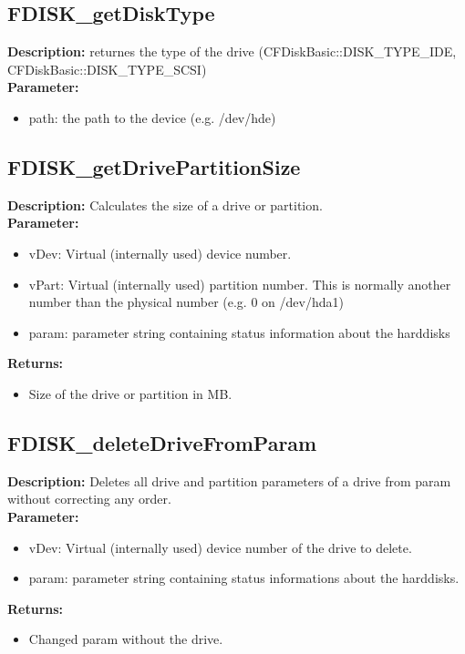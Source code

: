 \subsection{FDISK\_getDiskType}
\textbf{Description:} returnes the type of the drive (CFDiskBasic::DISK\_TYPE\_IDE, CFDiskBasic::DISK\_TYPE\_SCSI)\\
\textbf{Parameter:}
\begin{itemize}
\item path: the path to the device (e.g. /dev/hde)
\end{itemize}

\subsection{FDISK\_getDrivePartitionSize}
\textbf{Description:} Calculates the size of a drive or partition.\\
\textbf{Parameter:}
\begin{itemize}
\item vDev: Virtual (internally used) device number.
\item vPart: Virtual (internally used) partition number. This is normally another number than the physical number (e.g. 0 on /dev/hda1)
\item param: parameter string containing status information about the harddisks
\end{itemize}
\textbf{Returns:}
\begin{itemize}
\item Size of the drive or partition in MB.
\end{itemize}

\subsection{FDISK\_deleteDriveFromParam}
\textbf{Description:} Deletes all drive and partition parameters of a drive from param without correcting any order.\\
\textbf{Parameter:}
\begin{itemize}
\item vDev: Virtual (internally used) device number of the drive to delete.
\item param: parameter string containing status informations about the harddisks.
\end{itemize}
\textbf{Returns:}
\begin{itemize}
\item Changed param without the drive.
\end{itemize}


